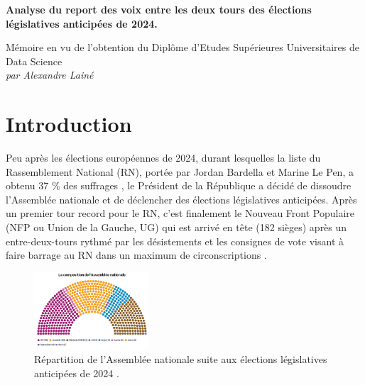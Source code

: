 \documentclass[11pt]{article}
\begin{document}
    

    \pagestyle{fancy}
    \fancyfoot{}
    \vspace{5cm}

    \begin{center}
        \Large \textbf{Analyse du report des voix entre les deux tours des élections législatives anticipées de 2024.}
    \end{center}
    
    \vspace{2cm}
    
    \begin{center}
        Mémoire en vu de l'obtention du Diplôme d'Etudes Supérieures Universitaires de Data Science \\
        \textit{par Alexandre Lainé}
    \end{center}

    \newpage
    \pagestyle{fancy}
    \fancyhead{} %
    \fancyfoot{} %
    \fancyfoot[R]{\thepage}

    \section{Introduction}

    Peu après les élections européennes de 2024, durant lesquelles la liste du Rassemblement National (RN), portée par Jordan Bardella et Marine Le Pen, a obtenu 37 \% des suffrages \cite{Le_Monde_2024a}, le Président de la République a décidé de dissoudre l'Assemblée nationale et de déclencher des élections législatives anticipées. Après un premier tour record pour le RN, c'est finalement le Nouveau Front Populaire (NFP ou Union de la Gauche, UG) qui est arrivé en tête (182 sièges) après un entre-deux-tours rythmé par les désistements et les consignes de vote visant à faire barrage au RN dans un maximum de circonscriptions \cite{Wikipédia_2024a}.

    \begin{figure}
        \begin{center}
            \includegraphics[width=0.38\textwidth]{Resultats_2024.png}    
        \end{center}
        \caption{Répartition de l'Assemblée nationale suite aux élections législatives anticipées de 2024 \cite{Le_Monde_2024b}.}
    \end{figure}
\end{document}
